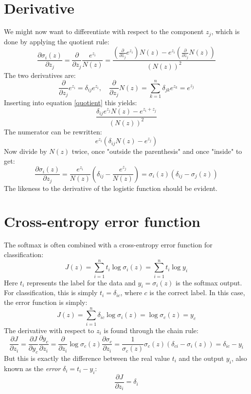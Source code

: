 \documentclass[12pt, a4paper]{article}
\numberwithin{equation}{section}
\begin{document}
\section{Derivative}
We might now want to differentiate with respect to the component $z_j$, which is done by applying the quotient rule:
\begin{equation}
\label{quotient}
\frac{\partial\sigma_i(z)}{\partial z_j}=\frac{\partial}{\partial z_j}\frac{e^{z_i}}{N(z)}=\frac{\left(\frac{\partial}{\partial z_j}e^{z_i}\right)N(z)-e^{z_i}\left(\frac{\partial}{\partial z_j}N(z)\right)}{(N(z))^2}
\end{equation}
The two derivatives are:
\begin{equation}
\frac{\partial}{\partial z_j}e^{z_i}=\delta_{ij}e^{z_i},\quad\frac{\partial}{\partial z_j}N(z)=\sum_{k=1}^n\delta_{jk}e^{z_k}=e^{z_j}
\end{equation}
Inserting into equation \ref{quotient} this yields:
\begin{equation}
\frac{\delta_{ij}e^{z_j}N(z)-e^{z_i+z_j}}{(N(z))^2}
\end{equation}
The numerator can be rewritten:
\begin{equation}
e^{z_i}\left(\delta_{ij}N(z)-e^{z_j}\right)
\end{equation}
Now divide by $N(z)$ twice, once "outside the parenthesis" and once "inside" to get:
\begin{equation}
\label{derivative}
\frac{\partial\sigma_i(z)}{\partial z_j}=\frac{e^{z_i}}{N(z)}\left(\delta_{ij}-\frac{e^{z_j}}{N(z)}\right)=\sigma_i(z)\left(\delta_{ij}-\sigma_j(z)\right)
\end{equation}
The likeness to the derivative of the logistic function should be evident.

\section{Cross-entropy error function}
The softmax is often combined with a cross-entropy error function for classification:
\begin{equation}
J(z)=\sum_{i=1}^n t_i\log\sigma_i(z)=\sum_{i=1}^n t_i\log y_i
\end{equation}
Here $t_i$ represents the label for the data and $y_i=\sigma_i(z)$ is the softmax output. For classification, this is simply $t_i=\delta_{ic}$, where $c$ is the correct label. In this case, the error function is simply:
\begin{equation}
J(z)=\sum_{i=1}^n\delta_{ic}\log\sigma_i(z)=\log\sigma_c(z)=y_c
\end{equation}
The derivative with respect to $z_i$ is found through the chain rule:
\begin{equation}
\frac{\partial J}{\partial z_i}=\frac{\partial J}{\partial y_c}\frac{\partial y_c}{\partial z_i}=\frac{\partial}{\partial z_i}\log\sigma_c(z)\frac{\partial\sigma_c}{\partial z_i}=\frac{1}{\sigma_c(z)}\sigma_c(z)\left(\delta_{ci}-\sigma_i(z)\right)=\delta_{ic}-y_i
\end{equation}
But this is exactly the difference between the real value $t_i$ and the output $y_i$, also known as the \textit{error} $\delta_i=t_i-y_i$:
\begin{equation}
\frac{\partial J}{\partial z_i}=\delta_i
\end{equation}
\end{document}
